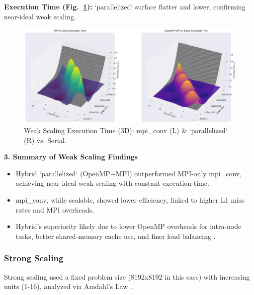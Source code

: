 \documentclass[conference, 10pt]{IEEEtran}
\begin{document}
    \textbf{Execution Time (Fig.~\ref{fig:weak-scaling-execution-time-3d}):} `parallelized` surface flatter and lower, confirming near-ideal weak scaling.
\begin{figure}[H]
    \centering
    \includegraphics[width=0.9\linewidth]{figures/weak_scaling_3d_surfaces.png}
    \caption{Weak Scaling Execution Time (3D): mpi\_conv (L) & `parallelized` (R) vs. Serial.}
    \label{fig:weak-scaling-execution-time-3d}
\end{figure}

\textbf{3. Summary of Weak Scaling Findings}
\begin{itemize}
    \item Hybrid `parallelized` (OpenMP+MPI) outperformed MPI-only mpi\_conv, achieving near-ideal weak scaling with constant execution time.
    \item mpi\_conv, while scalable, showed lower efficiency, linked to higher L1 miss rates and MPI overheads.
    \item Hybrid's superiority likely due to lower OpenMP overheads for intra-node tasks, better shared-memory cache use, and finer load balancing \cite{Gawrych2023}.
\end{itemize}

\subsubsection{\textbf{Strong Scaling}}

Strong scaling used a fixed problem size (8192x8192 in this case) with increasing units (1-16), analyzed via Amdahl's Law \cite{hager2021hpc}.
\end{document}
